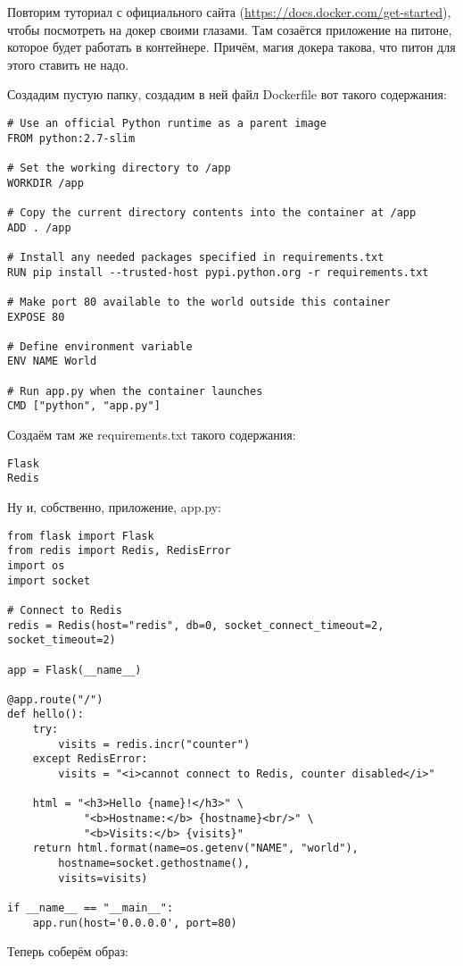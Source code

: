\documentclass[a5paper]{article}
\begin{document}
Повторим туториал с официального сайта (\url{https://docs.docker.com/get-started}), чтобы посмотреть на докер своими глазами. Там созаётся приложение на питоне, которое будет работать в контейнере. Причём, магия докера такова, что питон для этого ставить не надо.

Создадим пустую папку, создадим в ней файл Dockerfile вот такого содержания:
\begin{verbatim}
# Use an official Python runtime as a parent image
FROM python:2.7-slim

# Set the working directory to /app
WORKDIR /app

# Copy the current directory contents into the container at /app
ADD . /app

# Install any needed packages specified in requirements.txt
RUN pip install --trusted-host pypi.python.org -r requirements.txt

# Make port 80 available to the world outside this container
EXPOSE 80

# Define environment variable
ENV NAME World

# Run app.py when the container launches
CMD ["python", "app.py"]
\end{verbatim}

Создаём там же requirements.txt такого содержания:
\begin{verbatim}
Flask
Redis
\end{verbatim}

Ну и, собственно, приложение, app.py:
\begin{verbatim}
from flask import Flask
from redis import Redis, RedisError
import os
import socket

# Connect to Redis
redis = Redis(host="redis", db=0, socket_connect_timeout=2, socket_timeout=2)

app = Flask(__name__)

@app.route("/")
def hello():
    try:
        visits = redis.incr("counter")
    except RedisError:
        visits = "<i>cannot connect to Redis, counter disabled</i>"

    html = "<h3>Hello {name}!</h3>" \
            "<b>Hostname:</b> {hostname}<br/>" \
            "<b>Visits:</b> {visits}"
    return html.format(name=os.getenv("NAME", "world"), 
        hostname=socket.gethostname(), 
        visits=visits)

if __name__ == "__main__":
    app.run(host='0.0.0.0', port=80)
\end{verbatim}

Теперь соберём образ:
\end{document}
